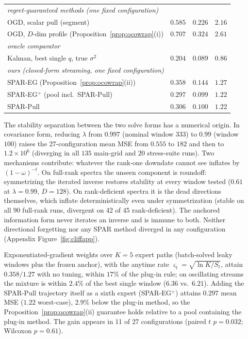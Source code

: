 \documentclass[10pt]{article}
\begin{document}
\begin{table}[t]
\begin{tabular}{lccc}
\multicolumn{3}{l}{\emph{regret-guaranteed methods (one fixed configuration)}}\\
OGD, scalar pull (segment) & $0.585$ & $0.226$ & $2.16$ \\
OGD, $D$-dim profile (Proposition~\ref{prop:ocowrap}(i)) & $0.707$ & $0.324$ & $2.61$ \\
\midrule
\multicolumn{3}{l}{\emph{oracle comparator}}\\
Kalman, best single $q$, true $\sigma^2$ & $\mathbf{0.204}$ & $\mathbf{0.089}$ & $\mathbf{0.86}$ \\
\midrule
\multicolumn{3}{l}{\emph{ours (closed-form streaming, one fixed configuration)}}\\
SPAR-EG (Proposition~\ref{prop:ocowrap}(ii)) & $0.358$ & $0.144$ & $1.27$ \\
SPAR-EG$^+$ (pool incl.\ SPAR-Pull) & $0.297$ & $0.099$ & $1.22$ \\
SPAR-Pull & $0.306$ & $0.100$ & $1.22$ \\
\bottomrule
\end{tabular}
\end{table}

The stability separation between the two solve forms has a numerical origin.
In covariance form, reducing $\lambda$ from $0.997$ (nominal window $333$) to $0.99$ (window $100$) raises the 27-configuration mean MSE from $0.555$ to $182$ and then to $1.2 \times 10^6$ (diverging in all $135$ main-grid and $20$ stress-suite runs).
Two mechanisms contribute: whatever the rank-one downdate cannot see inflates by $(1{-}\omega)^{-t}$.
On full-rank spectra the unseen component is roundoff: symmetrizing the iterated inverse restores stability at every window tested ($0.61$ at $\lambda = 0.99$, $D = 128$). On rank-deficient spectra it is the dead directions themselves, which inflate deterministically even under symmetrization (stable on all 90 full-rank runs, divergent on 42 of 45 rank-deficient). The anchored information form never iterates an inverse and is immune to both. Neither directional forgetting nor any SPAR method diverged in any configuration (Appendix Figure~\ref{fig:cliffapp}).

Exponentiated-gradient weights over $K = 5$ expert paths (batch-solved leaky windows plus the frozen anchor), with the anytime rate $\varsigma_t = \sqrt{\ln K / S_t}$, attain $0.358/1.27$ with no tuning, within $17\%$ of the plug-in rule; on oscillating streams the mixture is within $2.4\%$ of the best single window ($6.36$ vs.\ $6.21$).
Adding the SPAR-Pull trajectory itself as a sixth expert (SPAR-EG$^+$) attains $0.297$ mean MSE ($1.22$ worst-case), $2.9\%$ below the plug-in method, so the Proposition~\ref{prop:ocowrap}(ii) guarantee holds relative to a pool containing the plug-in method. The gain appears in 11 of 27 configurations (paired $t$ $p = 0.032$; Wilcoxon $p = 0.61$).
\end{document}
